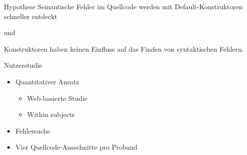 \documentclass[10pt]{beamer}
\begin{document}
	\begin{frame}[standout]{Hypothese}
		Semantische Fehler im Quellcode werden mit Default-Konstruktoren schneller entdeckt
		\begin{center}\small{und}\end{center}
		Konstruktoren haben keinen Einfluss auf das Finden von syntaktischen Fehlern.
	\end{frame}

	\begin{frame}{Nutzerstudie}
		\begin{itemize}
			\item Quantitativer Ansatz
			\begin{itemize}
				\item Web-basierte Studie\\
				\item Within subjects\\
			\end{itemize}
			\vspace{\baselineskip}
			\item Fehlersuche\\
			\vspace{\baselineskip}
			\item Vier Quellcode-Ausschnitte pro Proband\\
		\end{itemize}
	\end{frame}
\end{document}
